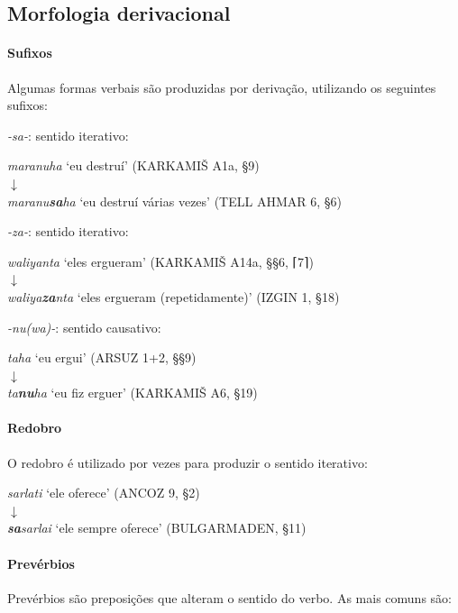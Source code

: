 \subsection{Morfologia derivacional}

\paragraph{Sufixos}
Algumas formas verbais são produzidas por derivação, utilizando os seguintes
sufixos:
\begin{compactenum}[(a)]
	\item \emph{-sa-}: sentido iterativo:
	\begin{center}
		\emph{maranuha} `eu destruí' (KARKAMIŠ A1a, §9)\\
		$\downarrow$\\
		\emph{maranu\textbf{sa}ha} `eu destruí várias vezes' (TELL AHMAR 6, §6)
	\end{center}
	\item \emph{-za-}: sentido iterativo:
	\begin{center}
		\emph{waliyanta} `eles ergueram' (KARKAMIŠ A14a, §§6, \textsc{⌈}7\textsc{⌉})\\
		$\downarrow$\\
		\emph{waliya\textbf{za}nta} `eles ergueram (repetidamente)' (IZGIN 1, §18)
	\end{center}
	\item \emph{-nu{(wa)}-}: sentido causativo:
	\begin{center}
		\emph{taha} `eu ergui' (ARSUZ 1+2, §§9)\\
		$\downarrow$\\
		\emph{ta\textbf{nu}ha} `eu fiz erguer' (KARKAMIŠ A6, §19)
	\end{center}
\end{compactenum}

\clearpage
\paragraph{Redobro}
O redobro é utilizado por vezes para produzir o sentido iterativo:
\begin{center}
	\emph{sarlati} `ele oferece' (ANCOZ 9, §2)\\
	$\downarrow$\\
	\emph{\textbf{sa}sarlai} `ele sempre oferece' (BULGARMADEN, §11)
\end{center}

\paragraph{Prevérbios}
Prevérbios são preposições que alteram o sentido do verbo.
As mais comuns são:

